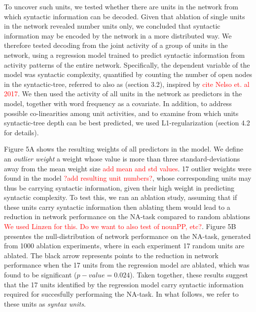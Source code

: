 To uncover such units, we tested whether there are units in the network from which syntactic information can be decoded. Given that ablation of single units in the network revealed number units only, we concluded that syntactic information may be encoded by the network in a more distributed way. We therefore tested decoding from the joint activity of a group of units in the network, using a regression model trained to predict syntactic information from activity patterns of the entire network. Specifically, the dependent variable of the model was syntactic complexity, quantified by counting the number of open nodes in the syntactic-tree, referred to also as  (section 3.2), inspired by \textcolor{red}{cite Nelso et. al 2017}. We then used the activity of all units in the network as predictors in the model, together with word frequency as a covariate. In addition, to address possible co-linearities among unit activities, and to examine from which units syntactic-tree depth can be best predicted, we used L1-regularization (section 4.2 for details). 

Figure 5A shows the resulting weights of all predictors in the model. We define an \textit{outlier weight} a weight whose value is more than three standard-deviations away from the mean weight size \textcolor{red}{add mean and std values}. 17 outlier weights were found in the model \textcolor{red}{?add resulting unit numbers?}, whose corresponding units may thus be carrying syntactic information, given their high weight in predicting syntactic complexity. To test this, we ran an ablation study, assuming that if these units carry syntactic information then ablating them would lead to a reduction in network performance on the NA-task compared to random ablations \textcolor{red}{We used Linzen for this. Do we want to also test of nounPP, etc?}. Figure 5B presentes the null-distribution of network performance on the NA-task, generated from 1000 ablation experiments, where in each experiment 17 random units are ablated. The black arrow represents points to the reduction in network performance when the 17 units from the regression model are ablated, which was found to be significant ($p-value=0.024$). Taken together, these results suggest that the 17 units identified by the regression model carry syntactic information required for succesfully performaing the NA-task. In what follows, we refer to these units as \textit{syntax units}.

